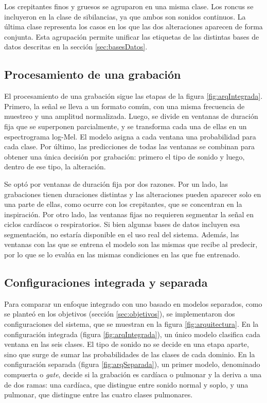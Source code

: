 Los crepitantes finos y gruesos se agruparon en una misma clase. Los roncus se incluyeron en la
clase de sibilancias, ya que ambos son sonidos continuos. La última clase representa los casos en
los que las dos alteraciones aparecen de forma conjunta. Esta agrupación permite unificar
las etiquetas de las distintas bases de datos descritas en la sección \ref{sec:basesDatos}.

\subsection{Procesamiento de una grabación}
\label{subsec:procesamiento}

El procesamiento de una grabación sigue las etapas de la figura \ref{fig:arqIntegrada}. Primero,
la señal se lleva a un formato común, con una misma frecuencia de muestreo y una amplitud
normalizada. Luego, se divide en ventanas de duración fija que se superponen parcialmente, y se transforma
cada una de ellas en un espectrograma log-Mel. El modelo asigna a cada ventana una probabilidad
para cada clase. Por último, las predicciones de todas las ventanas se combinan para obtener una
única decisión por grabación: primero el tipo de sonido y luego, dentro de ese tipo, la alteración.

Se optó por ventanas de duración fija por dos razones. Por un lado, las grabaciones tienen
duraciones distintas y las alteraciones pueden aparecer solo en una parte de ellas, como ocurre con
los crepitantes, que se concentran en la inspiración. Por otro lado, las ventanas fijas no
requieren segmentar la señal en ciclos cardíacos o respiratorios. Si bien algunas bases de datos
incluyen esa segmentación, no estaría disponible en el uso real del sistema. Además, las ventanas
con las que se entrena el modelo son las mismas que recibe al predecir, por lo que se lo evalúa en
las mismas condiciones en las que fue entrenado.

\subsection{Configuraciones integrada y separada}
\label{subsec:configuraciones}

Para comparar un enfoque integrado con uno basado en modelos separados, como se planteó en los
objetivos (sección \ref{sec:objetivos}), se implementaron dos configuraciones del sistema, que se
muestran en la figura \ref{fig:arquitectura}. En la configuración integrada (figura
\ref{fig:arqIntegrada}), un único modelo clasifica cada ventana en las seis clases. El tipo de
sonido no se decide en una etapa aparte, sino que surge de sumar las probabilidades de las clases
de cada dominio. En la configuración separada (figura \ref{fig:arqSeparada}), un primer modelo,
denominado compuerta o \textit{gate}, decide si la grabación es cardíaca o pulmonar y la deriva a
una de dos ramas: una cardíaca, que distingue entre sonido normal y soplo, y una pulmonar, que
distingue entre las cuatro clases pulmonares.

